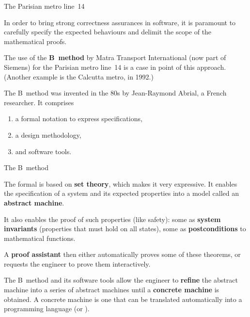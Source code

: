 \documentclass[compress,dvipdfmx]{beamer}
\begin{document}
\begin{frame}{The Parisian metro line~14}

  In order to bring strong correctness assurances in software, it is
  paramount to carefully specify the expected behaviours and delimit
  the scope of the mathematical proofs.

  \bigskip

  The use of the \textbf{B~method} by Matra Transport International
  (now part of Siemens) for the Parisian metro line~14 is a case in
  point of this approach. (Another example is the Calcutta metro, in
  1992.)

  \bigskip

   The B~method was invented in the 80s by Jean-Raymond Abrial, a
   French researcher. It comprises
   \begin{enumerate}

     \item a formal notation to express specifications,

     \item a design methodology,

     \item and software tools.

   \end{enumerate}

\end{frame}


\begin{frame}{The B~method}

  The formal \textbf{\Blang} is based on \textbf{set theory}, which
  makes it very expressive. It enables the specification of a system
  and its expected properties into a model called an \textbf{abstract
    machine}.

  \bigskip

  It also enables the proof of such properties (like safety): some as
  \textbf{system invariants} (properties that must hold on all
  states), some as \textbf{postconditions} to mathematical functions.

  \bigskip

  A \textbf{proof assistant} then either automatically proves some of
  these theorems, or requests the engineer to prove them
  interactively.

  \bigskip

  The B~method and its software tools allow the engineer to
  \textbf{refine} the abstract machine into a series of abstract
  machines until a \textbf{concrete machine} is obtained. A concrete
  machine is one that can be translated automatically into a
  programming language (\Clang or \Ada).

\end{frame}
\end{document}
